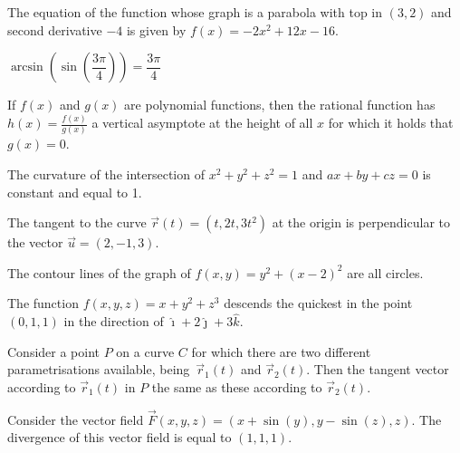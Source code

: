 \begin{Exercise}
\begin{center}
\end{center}

\Question The equation of the function whose graph is a parabola with top in $(3,2)$ and second derivative $-4$ is given by  $f(x)=-2x^2+12x-16$.

	
\Question $\arcsin \left(\sin \left(\dfrac{3\pi}{4} \right) \right) = \dfrac{3\pi}{4}$
	
\Question If $f(x)$ and $g(x)$ are polynomial functions, then the rational function has $h(x)=\frac{f(x)}{g(x)}$ a vertical asymptote at the height of all $x$ for which it holds that $g(x)=0$. 
	
\Question The curvature of the intersection of $x^2+y^2+z^2=1$ and $ax+by+cz=0$ is constant and equal to 1.
	
		
\Question The tangent to the curve $\vec{r}(t)= (t,2t,3t^2)$ at the origin is perpendicular to the vector $\vec{u}=(2,-1,3)$.

\Question The contour lines of the graph of $f(x,y)=y^2 + (x-2)^2$ are all circles.
	
\Question The function $f(x,y,z) = x + y^2 + z^3$ descends the quickest in the point $(0,1,1)$ in the direction of $\hat{\imath} + 2 \hat{\jmath} + 3 \hat{k}$. 
	
	
\Question Consider a point $P$ on a curve $C$ for which there are two different parametrisations available, being\ $\vec{r}_1(t)$ and $\vec{r}_2(t)$. Then the tangent vector according to $\vec{r}_1(t)$ in $P$ the same as these according to $\vec{r}_2(t)$.
	
	
\Question Consider the vector field $\vec{F}(x,y,z) = (x+\sin(y), y - \sin(z), z)$. The divergence of this vector field is equal to $(1,1,1)$.
\end{Exercise}


